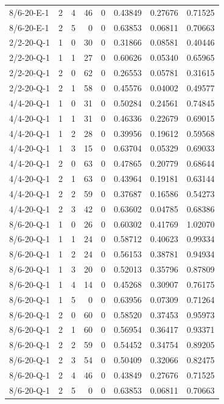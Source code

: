 \begin{longtable}{lrrrrrrr}
8/6-20-E-1 & 2 & 4 & 46 & 0 & 0.43849 & 0.27676 & 0.71525 \\
8/6-20-E-1 & 2 & 5 & 0 & 0 & 0.63853 & 0.06811 & 0.70663 \\
2/2-20-Q-1 & 1 & 0 & 30 & 0 & 0.31866 & 0.08581 & 0.40446 \\
2/2-20-Q-1 & 1 & 1 & 27 & 0 & 0.60626 & 0.05340 & 0.65965 \\
2/2-20-Q-1 & 2 & 0 & 62 & 0 & 0.26553 & 0.05781 & 0.31615 \\
2/2-20-Q-1 & 2 & 1 & 58 & 0 & 0.45576 & 0.04002 & 0.49577 \\
4/4-20-Q-1 & 1 & 0 & 31 & 0 & 0.50284 & 0.24561 & 0.74845 \\
4/4-20-Q-1 & 1 & 1 & 31 & 0 & 0.46336 & 0.22679 & 0.69015 \\
4/4-20-Q-1 & 1 & 2 & 28 & 0 & 0.39956 & 0.19612 & 0.59568 \\
4/4-20-Q-1 & 1 & 3 & 15 & 0 & 0.63704 & 0.05329 & 0.69033 \\
4/4-20-Q-1 & 2 & 0 & 63 & 0 & 0.47865 & 0.20779 & 0.68644 \\
4/4-20-Q-1 & 2 & 1 & 63 & 0 & 0.43964 & 0.19181 & 0.63144 \\
4/4-20-Q-1 & 2 & 2 & 59 & 0 & 0.37687 & 0.16586 & 0.54273 \\
4/4-20-Q-1 & 2 & 3 & 42 & 0 & 0.63602 & 0.04785 & 0.68386 \\
8/6-20-Q-1 & 1 & 0 & 26 & 0 & 0.60302 & 0.41769 & 1.02070 \\
8/6-20-Q-1 & 1 & 1 & 24 & 0 & 0.58712 & 0.40623 & 0.99334 \\
8/6-20-Q-1 & 1 & 2 & 24 & 0 & 0.56153 & 0.38781 & 0.94934 \\
8/6-20-Q-1 & 1 & 3 & 20 & 0 & 0.52013 & 0.35796 & 0.87809 \\
8/6-20-Q-1 & 1 & 4 & 14 & 0 & 0.45268 & 0.30907 & 0.76175 \\
8/6-20-Q-1 & 1 & 5 & 0 & 0 & 0.63956 & 0.07309 & 0.71264 \\
8/6-20-Q-1 & 2 & 0 & 60 & 0 & 0.58520 & 0.37453 & 0.95973 \\
8/6-20-Q-1 & 2 & 1 & 60 & 0 & 0.56954 & 0.36417 & 0.93371 \\
8/6-20-Q-1 & 2 & 2 & 59 & 0 & 0.54452 & 0.34754 & 0.89205 \\
8/6-20-Q-1 & 2 & 3 & 54 & 0 & 0.50409 & 0.32066 & 0.82475 \\
8/6-20-Q-1 & 2 & 4 & 46 & 0 & 0.43849 & 0.27676 & 0.71525 \\
8/6-20-Q-1 & 2 & 5 & 0 & 0 & 0.63853 & 0.06811 & 0.70663 \\

\end{longtable}
